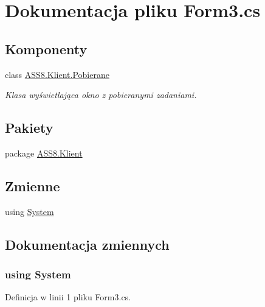 \hypertarget{a00045}{
\section{Dokumentacja pliku Form3.cs}
\label{d6/d97/a00045}
}
\subsection*{Komponenty}
\begin{CompactItemize}
\item 
class \hyperlink{a00019}{ASS8.Klient.Pobierane}
\begin{CompactList}\small\item\em Klasa wyświetlająca okno z pobieranymi zadaniami. \item\end{CompactList}\end{CompactItemize}
\subsection*{Pakiety}
\begin{CompactItemize}
\item 
package \hyperlink{a00060}{ASS8.Klient}
\end{CompactItemize}
\subsection*{Zmienne}
\begin{CompactItemize}
\item 
﻿using \hyperlink{a00045_81a223a02c34d82b47199f08308847f2}{System}
\end{CompactItemize}


\subsection{Dokumentacja zmiennych}
\hypertarget{a00045_81a223a02c34d82b47199f08308847f2}{
\subsubsection[{System}]{\setlength{\rightskip}{0pt plus 5cm}﻿using {\bf System}}}
\label{d6/d97/a00045_81a223a02c34d82b47199f08308847f2}




Definicja w linii 1 pliku Form3.cs.